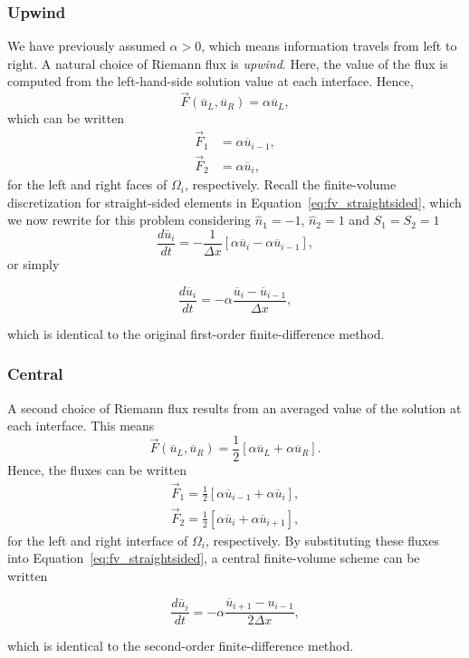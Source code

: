 \subsubsection{Upwind}
We have previously assumed $\alpha>0$, which means information travels from left to right. A natural choice of Riemann flux is \textit{upwind}. Here, the value of the flux is computed from the left-hand-side solution value at each interface. Hence, 
\begin{equation}
 \vec F(\overline u_L, \overline u_R) = \alpha \overline u_L, 
\end{equation}
which can be written 
\begin{align}
 \vec F_1 &= \alpha \overline u_{i-1}, \\ 
 \vec F_2 &= \alpha \overline u_{i},
\end{align}
for the left and right faces of $\Omega_i$, respectively. Recall the finite-volume discretization for straight-sided elements in Equation~\ref{eq:fv_straightsided}, which we now rewrite for this problem considering $\hat n_1=-1$, $\hat n_2=1$ and $S_1=S_2=1$
\begin{equation}
 \frac{d \overline{u}_i}{dt} = -\frac{1}{\Delta x} \left[\alpha \overline {u}_i - \alpha \overline u_{i-1}\right],
\end{equation}
or simply
\begin{eqBox}
\begin{equation}
 \frac{d \overline{u}_i}{dt} = -\alpha \frac{ \overline {u}_i - \overline u_{i-1}}{\Delta x},
\end{equation}
\end{eqBox}
which is identical to the original first-order finite-difference method. 
\subsubsection{Central}
A second choice of Riemann flux results from an averaged value of the solution at each interface. This means
\begin{equation}
 \vec F(\overline u_L, \overline u_R) = \frac{1}{2}\left[\alpha \overline u_L + \alpha \overline u_R \right].
\end{equation}
Hence, the fluxes can be written
\begin{align}
 \vec F_1 = \frac{1}{2}\left[\alpha \overline u_{i-1} + \alpha \overline u_{i} \right],\\
 \vec F_2 = \frac{1}{2}\left[\alpha \overline u_{i} + \alpha \overline u_{i+1} \right],
\end{align}
for the left and right interface of $\Omega_i$, respectively. By substituting these fluxes into Equation~\ref{eq:fv_straightsided}, a central finite-volume scheme can be written
\begin{eqBox}
\begin{equation}
 \frac{d\overline u_i}{dt} = - \alpha \frac{\overline u_{i+1} - u_{i-1}}{2 \Delta x},
\end{equation}
\end{eqBox}
which is identical to the second-order finite-difference method. 
